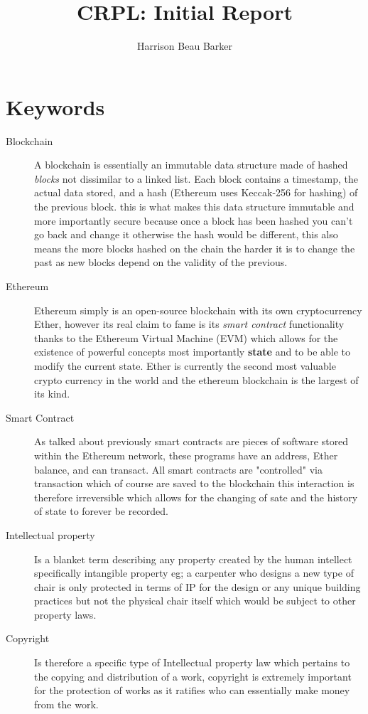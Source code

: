 \documentclass[12pt]{report}
\title{CRPL: Initial Report}
\author{Harrison Beau Barker}
\begin{document}
\maketitle
{}

\tableofcontents{}

\chapter{Keywords}

\begin{description}
  \item[Blockchain] A blockchain is essentially an immutable data structure made of hashed \textit{blocks} not dissimilar to a linked list. Each block contains a timestamp, the actual data stored, and a hash (Ethereum uses Keccak-256 for hashing) of the previous block. this is what makes this data structure immutable and more importantly secure because once a block has been hashed you can't go back and change it otherwise the hash would be different, this also means the more blocks hashed on the chain the harder it is to change the past as new blocks depend on the validity of the previous.
  \item[Ethereum] Ethereum simply is an open-source blockchain with its own cryptocurrency Ether, however its real claim to fame is its \textit{smart contract} functionality thanks to the Ethereum Virtual Machine (EVM) which allows for the existence of powerful concepts most importantly \textbf{state} and to be able to modify the current state. Ether is currently the second most valuable crypto currency in the world and the ethereum blockchain is the largest of its kind.
  \item[Smart Contract] As talked about previously smart contracts are pieces of software stored within the Ethereum network, these programs have an address, Ether balance, and can transact. All smart contracts are "controlled" via transaction which of course are saved to the blockchain this interaction is therefore irreversible which allows for the changing of sate and the history of state to forever be recorded.
  \item[Intellectual property] Is a blanket term describing any property created by the human intellect specifically intangible property eg; a carpenter who designs a new type of chair is only protected in terms of IP for the design or any unique building practices but not the physical chair itself which would be subject to other property laws.
  \item[Copyright] Is therefore a specific type of Intellectual property law which pertains to the copying and distribution of a work, copyright is extremely important for the protection of works as it ratifies who can essentially make money from the work.
\end{description}
\end{document}
